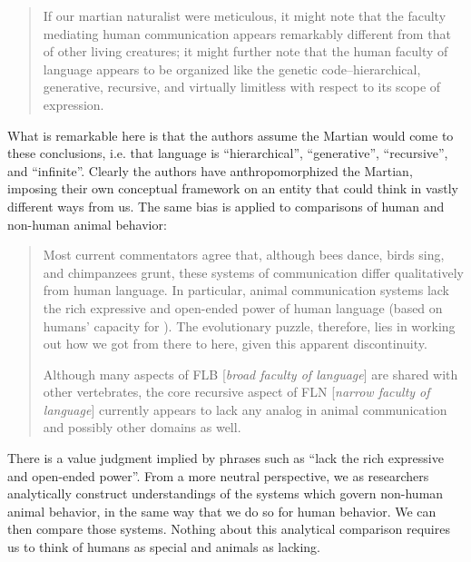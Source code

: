 \begin{quote}
If our martian naturalist were meticulous, it might note that the faculty mediating human communication appears remarkably different from that of other living creatures; it might further note that the human faculty of language appears to be organized like the genetic code--hierarchical, generative, recursive, and virtually limitless with respect to its scope of expression. \citep{HauserEtAl2002}
\end{quote}

  What is remarkable here is that the authors assume the Martian would come to these conclusions, i.e. that language is “hierarchical”, “generative”, “recursive”, and “infinite”. Clearly the authors have anthropomorphized the Martian, imposing their own conceptual framework on an entity that could think in vastly different ways from us. The same bias is applied to comparisons of human and non-human animal behavior:

\begin{quote}
Most current commentators agree that, although bees dance, birds sing, and chimpanzees grunt, these systems of communication differ qualitatively from human language. In particular, animal communication systems lack the rich expressive and open-ended power of human language (based on humans' capacity for ). The evolutionary puzzle, therefore, lies in working out how we got from there to here, given this apparent discontinuity. \citep{HauserEtAl2002}

Although many aspects of FLB [\textit{broad faculty of language}] are shared with other vertebrates, the core recursive aspect of FLN [\textit{narrow faculty of language}] currently appears to lack any analog in animal communication and possibly other domains as well. \citep{HauserEtAl2002}
\end{quote}

  There is a value judgment implied by phrases such as “lack the rich expressive and open-ended power”. From a more neutral perspective, we as researchers analytically construct understandings of the systems which govern non-human animal behavior, in the same way that we do so for human behavior. We can then compare those systems. Nothing about this analytical comparison requires us to think of humans as special and animals as lacking.

